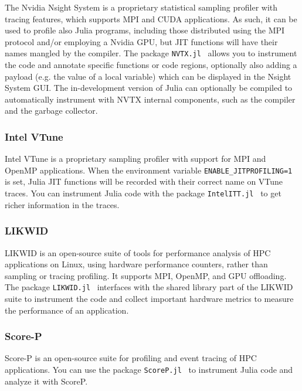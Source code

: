 \documentclass{juliacon}
\newcommand{\jlpkg}[1]{\texttt{#1}}
\begin{document}
The Nvidia Nsight System is a proprietary statistical sampling profiler with tracing features, which supports MPI and CUDA applications.
As such, it can be used to profile also Julia programs, including those distributed using the MPI protocol and/or employing a Nvidia GPU, but JIT functions will have their names mangled by the compiler.
The package \jlpkg{NVTX.jl}~\cite{nvtxjl} allows you to instrument the code and annotate specific functions or code regions, optionally also adding a payload (e.g. the value of a local variable) which can be displayed in the Nsight System GUI.
The in-development version of Julia can optionally be compiled to automatically instrument with NVTX internal components, such as the compiler and the garbage collector.

\subsubsection*{Intel VTune}
\label{sec:intel-vtune}

Intel VTune is a proprietary sampling profiler with support for MPI and OpenMP applications.
When the environment variable \texttt{ENABLE\_JITPROFILING=1} is set, Julia JIT functions will be recorded with their correct name on VTune traces.
You can instrument Julia code with the package \jlpkg{IntelITT.jl}~\cite{intelittjl} to get richer information in the traces.

\subsubsection*{LIKWID}
\label{sec:likwid}

LIKWID is an open-source suite of tools for performance analysis of HPC applications on Linux, using hardware performance counters, rather than sampling or tracing profiling.
It supports MPI, OpenMP, and GPU offloading. The package \jlpkg{LIKWID.jl}~\cite{likwidjl} interfaces with the shared library part of the LIKWID suite to instrument the code and collect important hardware metrics to measure the performance of an application.

\subsubsection*{Score-P}
\label{sec:score-p}

Score-P is an open-source suite for profiling and event tracing of HPC applications.
You can use the package \jlpkg{ScoreP.jl}~\cite{scorepjl} to instrument Julia code and analyze it with ScoreP.
\end{document}
